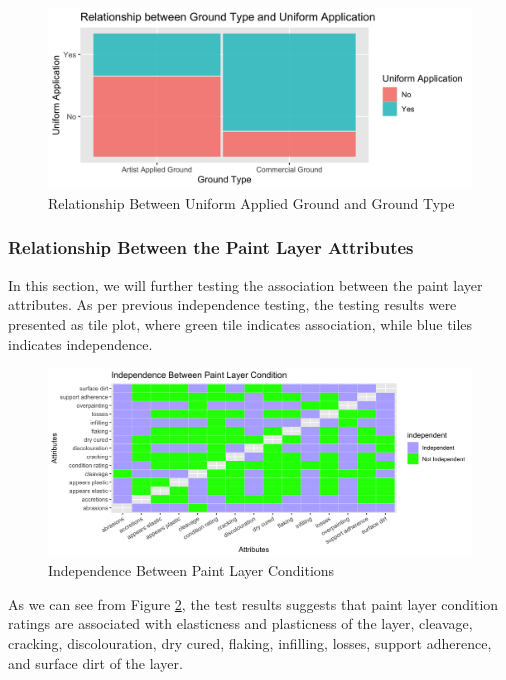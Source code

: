 \documentclass[11pt, oneside]{article}
\begin{document}
\begin{figure}[H]
    \centering
    \includegraphics[scale=0.15]{images/type_uniform.png}
    \caption{Relationship Between Uniform Applied Ground and Ground Type}
    \label{gr_uniform}
\end{figure}

\subsubsection{Relationship Between the Paint Layer Attributes}
In this section, we will further testing the association between the paint layer attributes. As per previous independence testing, the testing results were presented as tile plot, where green tile indicates association, while blue tiles indicates independence. 

\begin{figure}[H]
    \centering
    \includegraphics[scale=0.17]{images/pl_tile.png}
    \caption{Independence Between Paint Layer Conditions}
    \label{pl_tile}
\end{figure}

\noindent As we can see from Figure \ref{pl_tile}, the test results suggests that paint layer condition ratings are associated with elasticness and plasticness of the layer, cleavage, cracking, discolouration, dry cured, flaking, infilling, losses, support adherence, and surface dirt of the layer. 
\end{document}
